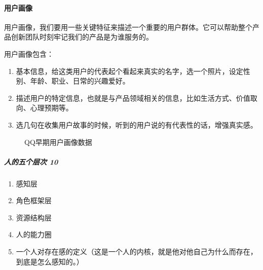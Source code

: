 \documentclass[letterpaper,11pt,english]{sphinxmanual}
\begin{document}
\paragraph{用户画像}
\label{\detokenize{chapter_skill/users_analysis:id8}}
用户画像，我们要用一些关键特征来描述一个重要的用户群体。它可以帮助整个产品创新团队时刻牢记我们的产品是为谁服务的。

用户画像包含：
\begin{enumerate}
%
\item {} 
基本信息，给这类用户的代表起个看起来真实的名字，选一个照片，设定性别、年龄、职业、日常的兴趣爱好。

\item {} 
描述用户的特定信息，也就是与产品领域相关的信息，比如生活方式、价值取向、心理预期等。

\item {} 
选几句在收集用户故事的时候，听到的用户说的有代表性的话，增强真实感。

\end{enumerate}

\begin{figure}[H]
\centering
\capstart

\noindent{}
\caption{QQ早期用户画像数据}\label{\detokenize{chapter_skill/users_analysis:id27}}\end{figure}


\subparagraph{人的五个层次 10\sphinxfootnotemark[156]}
\label{\detokenize{chapter_skill/users_analysis:id9}}%
\begin{footnotetext}[156]\sphinxAtStartFootnote
{}
%
\end{footnotetext}\ignorespaces \begin{enumerate}
%
\item {} 
感知层

\item {} 
角色框架层

\item {} 
资源结构层

\item {} 
人的能力圈

\item {} 
一个人对存在感的定义（这是一个人的内核，就是他对他自己为什么而存在，到底是怎么感知的。）

\end{enumerate}
\end{document}
